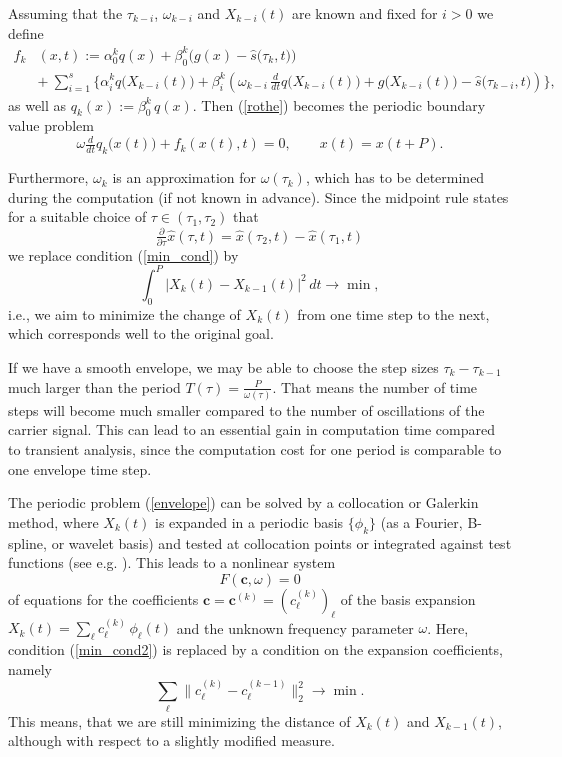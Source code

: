 \documentclass{siamltex}
\begin{document}
Assuming that the $\tau_{k-i}$, $\omega_{k-i}$ and $X_{k-i}(t)$ are known and fixed
for $i>0$ we define
\begin{align*}
f_k&(x,t) :=\alpha^k_0 q(x) + \beta^k_0\Big(g(x)-\hat{s}\big(\tau_k,t\big)\Big)\\[-.5ex]
&+~\sum_{i=1}^s\Bigg\{ \alpha^k_i q\big(X_{k-i}(t)\big)
+ \beta^k_i \left(\omega_{k-i}\,\frac{d}{dt}q\big(X_{k-i}(t)\big)
                          +g\big(X_{k-i}(t)\big)-\hat{s}\big(\tau_{k-i},t\big)\right)\Bigg\},
\end{align*}
as well as $q_k(x) := \beta^k_0\,q(x)$.
Then (\ref{rothe}) becomes the periodic boundary value problem
\begin{equation}\label{envelope}
\omega\tfrac{d}{dt}q_k\big(x(t)) + f_k(x(t),t) = 0,\qquad x(t) = x(t+P).
\end{equation}

Furthermore, $\omega_k$ is an approximation 
for $\omega(\tau_k)$, which has to be determined during the computation (if not known in advance).
Since the midpoint rule states for a suitable choice of $\tau\in(\tau_1,\tau_2)$ that
$$
\tfrac{\partial}{\partial\tau}\hat{x}(\tau,t)=\hat{x}(\tau_2,t)-\hat{x}(\tau_1,t)
$$
we replace condition (\ref{min_cond}) by
\begin{equation}
\label{min_cond2}
\int_0^P\big|X_k(t)-X_{k-1}(t)\big|^2\,dt\to\min,
\end{equation}
i.e., we aim to minimize the
change of $X_k(t)$ from one time step to the next, which corresponds well to the original goal.

If we have a smooth envelope, we may be able to choose the step sizes $\tau_k-\tau_{k-1}$ much larger
than the period $T(\tau)=\frac{P}{\omega(\tau)}$. That means the number of time steps will become much smaller compared to the number
of oscillations of the carrier signal. This can lead to an essential gain in computation time compared
to transient analysis, since the computation cost for one period is comparable to one envelope time step. 

The periodic problem (\ref{envelope})
can be solved by a collocation or Galerkin method, where $X_k(t)$ is expanded
in a periodic basis $\{\phi_k\}$ 
(as a Fourier, B-spline, or wavelet basis) and tested at collocation points or integrated
against test functions (see e.g. \cite{BiDau10a,BiDau10b}). 
This leads to a nonlinear system 
\begin{equation}\label{nonlinear}
F(\bm{c},\omega) = 0
\end{equation}
of equations for the coefficients
$\bm{c}=\bm{c}^{(k)}=(c^{(k)}_\ell)_\ell$ of the basis expansion 
$X_k(t)=\sum_\ell c^{(k)}_\ell\,\phi_\ell(t)$ and the unknown frequency parameter $\omega$. 
Here, condition
(\ref{min_cond2}) is replaced by a condition on the expansion coefficients, namely
\begin{equation}\label{min_cond3}
\sum_\ell\|c^{(k)}_\ell-c^{(k-1)}_\ell\big\|^2_2\to \min.
\end{equation} 
This means, that we are still minimizing the distance of $X_k(t)$ and $X_{k-1}(t)$, although with
respect to a slightly modified measure.
\end{document}
